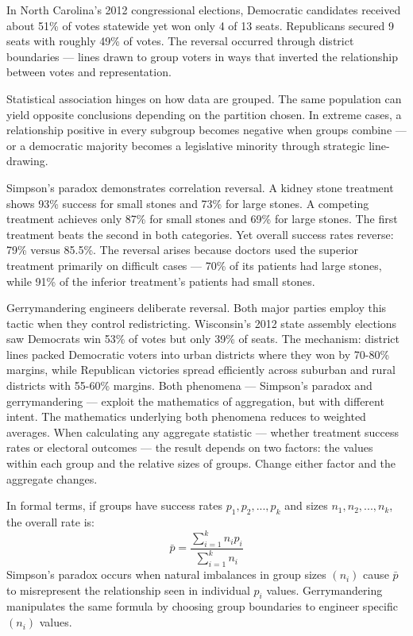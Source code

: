 In North Carolina's 2012 congressional elections, Democratic candidates received about 51\% of votes statewide yet won only 4 of 13 seats. Republicans secured 9 seats with roughly 49\% of votes. The reversal occurred through district boundaries — lines drawn to group voters in ways that inverted the relationship between votes and representation.

Statistical association hinges on how data are grouped. The same population can yield opposite conclusions depending on the partition chosen. In extreme cases, a relationship positive in every subgroup becomes negative when groups combine — or a democratic majority becomes a legislative minority through strategic line-drawing.

Simpson's paradox demonstrates correlation reversal. A kidney stone treatment shows 93\% success for small stones and 73\% for large stones. A competing treatment achieves only 87\% for small stones and 69\% for large stones. The first treatment beats the second in both categories. Yet overall success rates reverse: 79\% versus 85.5\%. The reversal arises because doctors used the superior treatment primarily on difficult cases — 70\% of its patients had large stones, while 91\% of the inferior treatment's patients had small stones.

Gerrymandering engineers deliberate reversal. Both major parties employ this tactic when they control redistricting. Wisconsin's 2012 state assembly elections saw Democrats win 53\% of votes but only 39\% of seats. The mechanism: district lines packed Democratic voters into urban districts where they won by 70-80\% margins, while Republican victories spread efficiently across suburban and rural districts with 55-60\% margins. Both phenomena — Simpson's paradox and gerrymandering — exploit the mathematics of aggregation, but with different intent. The mathematics underlying both phenomena reduces to weighted averages. When calculating any aggregate statistic — whether treatment success rates or electoral outcomes — the result depends on two factors: the values within each group and the relative sizes of groups. Change either factor and the aggregate changes.

In formal terms, if groups have success rates $p_1, p_2, ..., p_k$ and sizes $n_1, n_2, ..., n_k$, the overall rate is:
\[
\bar{p} = \frac{\sum_{i=1}^k n_i p_i}{\sum_{i=1}^k n_i}
\]
Simpson's paradox occurs when natural imbalances in group sizes $(n_i)$ cause $\bar{p}$ to misrepresent the relationship seen in individual $p_i$ values. Gerrymandering manipulates the same formula by choosing group boundaries to engineer specific $(n_i)$ values.

